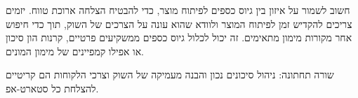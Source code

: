 חשוב לשמור על איזון בין גיוס כספים לפיתוח מוצר, כדי להבטיח הצלחה ארוכת טווח. יזמים צריכים להקדיש זמן לפיתוח המוצר ולוודא שהוא עונה על הצרכים של השוק, תוך כדי חיפוש אחר מקורות מימון מתאימים. זה יכול לכלול גיוס כספים ממשקיעים פרטיים, קרנות הון סיכון או אפילו קמפיינים של מימון המונים.

\begin{takeaway}
שורה תחתונה: ניהול סיכונים נכון והבנה מעמיקה של השוק וצרכי הלקוחות הם קריטיים להצלחת כל סטארט-אפ.
\end{takeaway}
